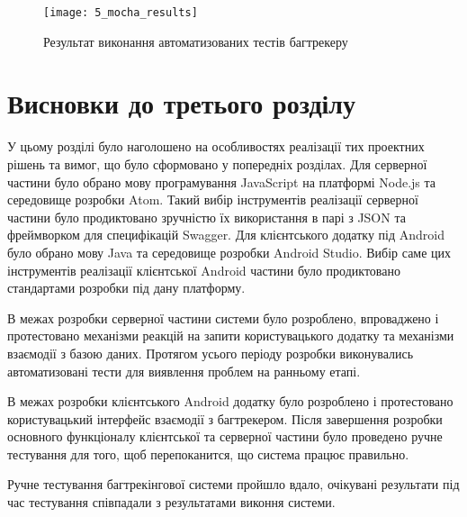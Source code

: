 \documentclass[../main.tex]{subfiles}
\begin{document}
	\begin{figure}[H]
		\centering
		\texttt{[image: 5\_mocha\_results]}
		\caption{Результат виконання автоматизованих тестів багтрекеру}
		\label{test_results}
	\end{figure}

\section{Висновки до третього розділу}

	У цьому розділі було наголошено на особливостях реалізації тих проектних рішень та вимог, що було сформовано у попередніх розділах. Для серверної частини було обрано мову програмування JavaScript на платформі Node.js та середовище розробки Atom. Такий вибір інструментів реалізації серверної частини було продиктовано зручністю їх використання в парі з JSON та фреймворком для специфікацій Swagger. Для клієнтського додатку під Android було обрано мову Java та середовище розробки Android Studio. Вибір саме цих інструментів реалізації клієнтської Android частини було продиктовано стандартами розробки під дану платформу.
	
	В межах розробки серверної частини системи було розроблено, впроваджено і протестовано механізми реакцій на запити користувацького додатку та механізми взаємодії з базою даних. Протягом усього періоду розробки виконувались автоматизовані тести для виявлення проблем на ранньому етапі.
	
	В межах розробки клієнтського Android додатку було розроблено і протестовано користувацький інтерфейс взаємодії з багтрекером. Після завершення розробки основного функціоналу клієнтської та серверної частини було проведено ручне тестування для того, щоб перепоканится, що система працює правильно.
	
	Ручне тестування багтрекінгової системи пройшло вдало, очікувані результати під час тестування співпадали з результатами виконня системи.
\end{document}
